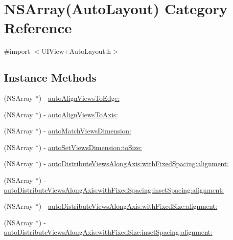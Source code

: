 \hypertarget{category_n_s_array_07_auto_layout_08}{}\section{N\+S\+Array(Auto\+Layout) Category Reference}
\label{category_n_s_array_07_auto_layout_08}


{\ttfamily \#import $<$U\+I\+View+\+Auto\+Layout.\+h$>$}

\subsection*{Instance Methods}
\begin{DoxyCompactItemize}
\item 
(N\+S\+Array $\ast$) -\/ \mbox{\hyperlink{category_n_s_array_07_auto_layout_08_a3ee97fb9058e640aa3f7df1e6595a118}{auto\+Align\+Views\+To\+Edge\+:}}
\item 
(N\+S\+Array $\ast$) -\/ \mbox{\hyperlink{category_n_s_array_07_auto_layout_08_a56546bae073c0f492176b7cf1d023f2c}{auto\+Align\+Views\+To\+Axis\+:}}
\item 
(N\+S\+Array $\ast$) -\/ \mbox{\hyperlink{category_n_s_array_07_auto_layout_08_a0b92dda230f54b1c2d432203dac1d240}{auto\+Match\+Views\+Dimension\+:}}
\item 
(N\+S\+Array $\ast$) -\/ \mbox{\hyperlink{category_n_s_array_07_auto_layout_08_a49d4d37abcfd84afc7d1bebe065f2d0d}{auto\+Set\+Views\+Dimension\+:to\+Size\+:}}
\item 
(N\+S\+Array $\ast$) -\/ \mbox{\hyperlink{category_n_s_array_07_auto_layout_08_abdc2144c8f2b1023626e0fbc84c97cc7}{auto\+Distribute\+Views\+Along\+Axis\+:with\+Fixed\+Spacing\+:alignment\+:}}
\item 
(N\+S\+Array $\ast$) -\/ \mbox{\hyperlink{category_n_s_array_07_auto_layout_08_a4ead43393a6700e0d78736fc04827fc7}{auto\+Distribute\+Views\+Along\+Axis\+:with\+Fixed\+Spacing\+:inset\+Spacing\+:alignment\+:}}
\item 
(N\+S\+Array $\ast$) -\/ \mbox{\hyperlink{category_n_s_array_07_auto_layout_08_a62dc58a8a134a4860af9c024720ecbb3}{auto\+Distribute\+Views\+Along\+Axis\+:with\+Fixed\+Size\+:alignment\+:}}
\item 
(N\+S\+Array $\ast$) -\/ \mbox{\hyperlink{category_n_s_array_07_auto_layout_08_a0d1a8ee4b675ef4b9724f57cf0d5ce97}{auto\+Distribute\+Views\+Along\+Axis\+:with\+Fixed\+Size\+:inset\+Spacing\+:alignment\+:}}
\end{DoxyCompactItemize}


